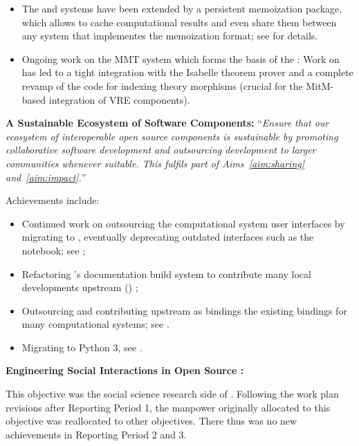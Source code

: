 \begin{compactenum}[\bf {Obj} 1\rm]
\begin{itemize}
  \item The \SageMath and \GAP systems have been extended by a persistent memoization package, which allows to cache computational results and even share them between any system that implementes the memoization format; see  for details.
  \item Ongoing work on the MMT system which forms the basis of the : Work on  has led to a tight integration with the Isabelle theorem prover and a complete revamp of the code for indexing theory morphisms (crucial for the MitM-based integration of VRE components).
  \end{itemize}

\item \label{objective:sustainable}
  \textbf{A Sustainable Ecosystem of Software Components:}
  ``\emph{Ensure that our ecosystem of
  interoperable open source components is \emph{sustainable} by
  promoting collaborative software development and outsourcing
  development to larger communities whenever suitable. This fulfils
  part of Aims~\ref{aim:sharing} and~\ref{aim:impact}.}''

  Achievements include:
  \begin{itemize}
  \item Continued work on outsourcing the computational system user interfaces by migrating to \Jupyter, eventually deprecating outdated interfaces such as the \Sage notebook; see ;
  \item Refactoring \Sage's documentation build system to contribute many local developments
    upstream (\Sphinx) ;
  \item Outsourcing and contributing upstream as \Python bindings the existing \Sage
    bindings for many computational systems; see .
  \item Migrating \Sage to Python 3, see .
  \end{itemize}

\begingroup
\color{gray}
\item \label{objective:social}
  \textbf{Engineering Social Interactions in Open Source \VRE:}

  This objective was the social science research side of
  . Following the work plan revisions after
  Reporting Period 1, the manpower originally allocated to this
  objective was reallocated to other objectives. There thus was no new
  achievements in Reporting Period 2 and 3.


\end{compactenum}
